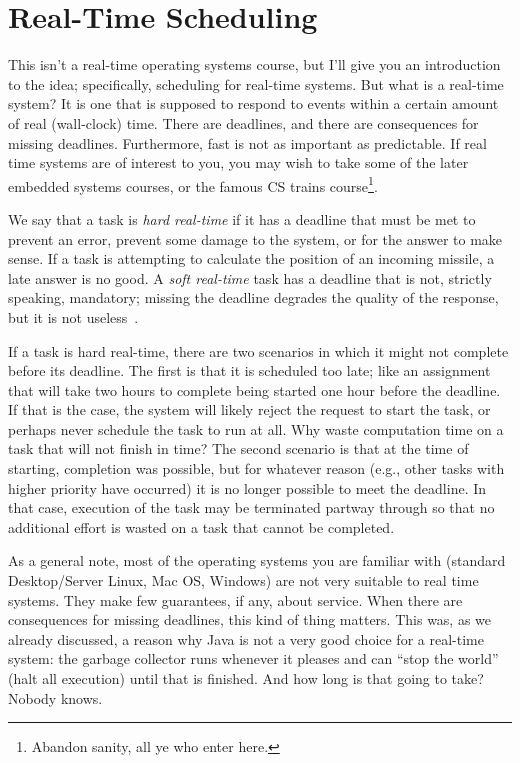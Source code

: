 




\section*{Real-Time Scheduling}
This isn't a real-time operating systems course, but I'll give you an introduction to the idea; specifically, scheduling for real-time systems. But what is a real-time system? It is one that is supposed to respond to events within a certain amount of real (wall-clock) time. There are deadlines, and there are consequences for missing deadlines. Furthermore, fast is not as important as predictable. If real time systems are of interest to you, you may wish to take some of the later embedded systems courses, or the famous CS trains course\footnote{Abandon sanity, all ye who enter here.}.

We say that a task is \textit{hard real-time} if it has a deadline that must be met to prevent an error, prevent some damage to the system, or for the answer to make sense. If a task is attempting to calculate the position of an incoming missile, a late answer is no good. A \textit{soft real-time} task has a deadline that is not, strictly speaking, mandatory; missing the deadline degrades the quality of the response, but it is not useless~\cite{osi}.

If a task is hard real-time, there are two scenarios in which it might not complete before its deadline. The first is that it is scheduled too late; like an assignment that will take two hours to complete being started one hour before the deadline. If that is the case, the system will likely reject the request to start the task, or perhaps never schedule the task to run at all. Why waste computation time on a task that will not finish in time? The second scenario is that at the time of starting, completion was possible, but for whatever reason (e.g., other tasks with higher priority have occurred) it is no longer possible to meet the deadline. In that case, execution of the task may be terminated partway through so that no additional effort is wasted on a task that cannot be completed.

As a general note, most of the operating systems you are familiar with (standard Desktop/Server Linux, Mac OS, Windows) are not very suitable to real time systems. They make few guarantees, if any, about service. When there are consequences for missing deadlines, this kind of thing matters. This was, as we already discussed, a reason why Java is not a very good choice for a real-time system: the garbage collector runs whenever it pleases and can ``stop the world'' (halt all execution) until that is finished. And how long is that going to take? Nobody knows.

